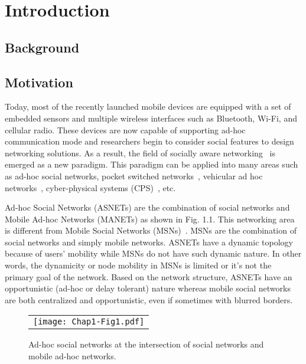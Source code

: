 \chapter{Introduction}\label{Chap1}

\section{Background}\label{Chap1_01}

\section{Motivation}\label{Chap1_01}

Today, most of the recently launched mobile devices are equipped with a set of embedded sensors and multiple wireless interfaces such as Bluetooth, Wi-Fi, and cellular radio. These devices are now capable of supporting ad-hoc communication mode and researchers begin to consider social features to design networking solutions. As a result, the field of socially aware networking~\cite{FXia2013} is emerged as a new paradigm. This paradigm can be applied into many areas such as ad-hoc social networks, pocket switched networks~\cite{SWang2012}, vehicular ad hoc networks~\cite{WChen2008}, cyber-physical systems (CPS)~\cite{FJWu2011}, etc.

Ad-hoc Social Networks (ASNETs) are the combination of social networks and Mobile Ad-hoc Networks (MANETs) as shown in Fig. 1.1. This networking area is different from Mobile Social Networks (MSNs)~\cite{NKayastha2012}. MSNs are the combination of social networks and simply mobile networks. ASNETs have a dynamic topology because of users' mobility while MSNs do not have such dynamic nature. In other words, the dynamicity or node mobility in MSNs is limited or it's not the primary goal of the network. Based on the network structure, ASNETs have an opportunistic (ad-hoc or delay tolerant) nature whereas mobile social networks are both centralized and opportunistic, even if sometimes with blurred borders.
\begin{figure}[b]
\begin{center}
  \begin{tabular}{c}
  \texttt{[image: Chap1-Fig1.pdf]}
  \end{tabular}
  \caption{Ad-hoc social networks at the intersection of social networks and mobile ad-hoc networks.}
\end{center}
\end{figure}

